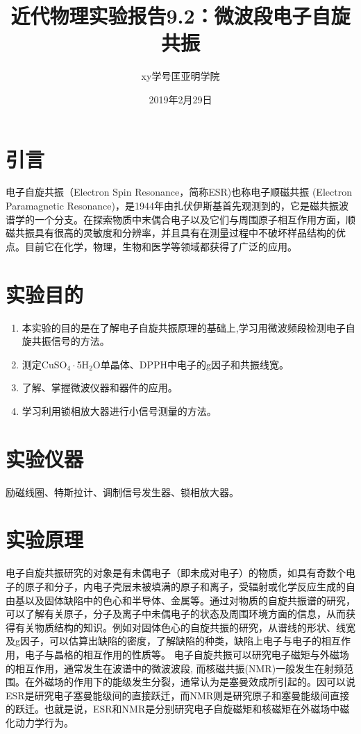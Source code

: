 \documentclass[a4paper]{article}
\title{近代物理实验报告9.2：微波段电子自旋共振}
\author{xy\quad 学号\quad 匡亚明学院}
\date{2019年2月29日}
\begin{document}
\maketitle


\section{引言}
电子自旋共振（Electron Spin Resonance，简称ESR)也称电子顺磁共振 (Electron Paramagnetic Resonance)，是1944年由扎伏伊斯基首先观测到的，它是磁共振波谱学的一个分支。在探索物质中末偶合电子以及它们与周围原子相互作用方面，顺磁共振具有很高的灵敏度和分辨率，并且具有在测量过程中不破坏样品结构的优点。目前它在化学，物理，生物和医学等领域都获得了广泛的应用。

\section{实验目的}
\begin{enumerate}
\item 本实验的目的是在了解电子自旋共振原理的基础上,学习用微波频段检测电子自旋共振信号的方法。
\item 测定CuSO$_4\cdot$5H$_2$O单晶体、DPPH中电子的g因子和共振线宽。
\item 了解、掌握微波仪器和器件的应用。
\item 学习利用锁相放大器进行小信号测量的方法。
\end{enumerate}

\section{实验仪器}
励磁线圈、特斯拉计、调制信号发生器、锁相放大器。

\section{实验原理}
电子自旋共振研究的对象是有未偶电子（即未成对电子）的物质，如具有奇数个电子的原子和分子，内电子壳层未被填满的原子和离子，受辐射或化学反应生成的自由基以及固体缺陷中的色心和半导体、金属等。通过对物质的自旋共振谱的研究，可以了解有关原子，分子及离子中未偶电子的状态及周围环境方面的信息，从而获得有关物质结构的知识。例如对固体色心的自旋共振的研究，从谱线的形状、线宽及g因子，可以估算出缺陷的密度，了解缺陷的种类，缺陷上电子与电子的相互作用，电子与晶格的相互作用的性质等。
电子自旋共振可以研究电子磁矩与外磁场的相互作用，通常发生在波谱中的微波波段, 而核磁共振(NMR)一般发生在射频范围。在外磁场的作用下的能级发生分裂，通常认为是塞曼效成所引起的。因可以说ESR是研究电子塞曼能级间的直接跃迁，而NMR则是研究原子和塞曼能级间直接的跃迁。也就是说，ESR和NMR是分别研究电子自旋磁矩和核磁矩在外磁场中磁化动力学行为。
\end{document}
